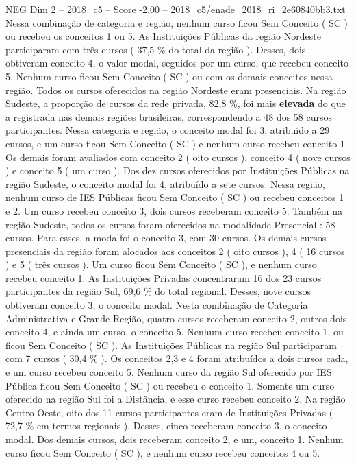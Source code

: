 \begin{textsample}{NEG Dim 2 – 2018\_c5 – Score -2.00 – 2018\_c5/enade\_2018\_ri\_2e60840bb3.txt}
Nessa combinação de categoria e região, nenhum curso ficou Sem Conceito ( SC ) ou recebeu os conceitos 1 ou 5.
As Instituições Públicas da região Nordeste participaram com três cursos ( 37,5 \% do total da região ).
Desses, dois obtiveram conceito 4, o valor modal, seguidos por um curso, que recebeu conceito 5.
Nenhum curso ficou Sem Conceito ( SC ) ou com os demais conceitos nessa região.
Todos os cursos oferecidos na região Nordeste eram presenciais.
Na região Sudeste, a proporção de cursos da rede privada, 82,8 \%, foi mais \textbf{elevada} do que a registrada nas demais regiões brasileiras, correspondendo a 48 dos 58 cursos participantes.
Nessa categoria e região, o conceito modal foi 3, atribuído a 29 cursos, e um curso ficou Sem Conceito ( SC ) e nenhum curso recebeu conceito 1.
Os demais foram avaliados com conceito 2 ( oito cursos ), conceito 4 ( nove cursos ) e conceito 5 ( um curso ).
Dos dez cursos oferecidos por Instituições Públicas na região Sudeste, o conceito modal foi 4, atribuído a sete cursos.
Nessa região, nenhum curso de IES Públicas ficou Sem Conceito ( SC ) ou recebeu conceitos 1 e 2.
Um curso recebeu conceito 3, dois cursos receberam conceito 5.
Também na região Sudeste, todos os cursos foram oferecidos na modalidade Presencial : 58 cursos.
Para esses, a moda foi o conceito 3, com 30 cursos.
Os demais cursos presenciais da região foram alocados aos conceitos 2 ( oito cursos ), 4 ( 16 cursos ) e 5 ( três cursos ).
Um curso ficou Sem Conceito ( SC ), e nenhum curso recebeu conceito 1.
As Instituições Privadas concentraram 16 dos 23 cursos participantes da região Sul, 69,6 \% do total regional.
Desses, nove cursos obtiveram conceito 3, o conceito modal.
Nesta combinação de Categoria Administrativa e Grande Região, quatro cursos receberam conceito 2, outros dois, conceito 4, e ainda um curso, o conceito 5.
Nenhum curso recebeu conceito 1, ou ficou Sem Conceito ( SC ).
As Instituições Públicas na região Sul participaram com 7 cursos ( 30,4 \% ).
Os conceitos 2,3 e 4 foram atribuídos a dois cursos cada, e um curso recebeu conceito 5.
Nenhum curso da região Sul oferecido por IES Pública ficou Sem Conceito ( SC ) ou recebeu o conceito 1.
Somente um curso oferecido na região Sul foi a Distância, e esse curso recebeu conceito 2.
Na região Centro-Oeste, oito dos 11 cursos participantes eram de Instituições Privadas ( 72,7 \% em termos regionais ).
Desses, cinco receberam conceito 3, o conceito modal.
Dos demais cursos, dois receberam conceito 2, e um, conceito 1.
Nenhum curso ficou Sem Conceito ( SC ), e nenhum curso recebeu conceitos 4 ou 5.

\end{textsample}
